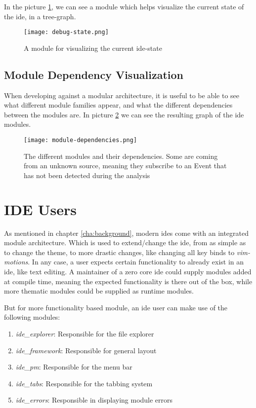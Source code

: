 In the picture \ref{pic:debugState}, we can see a module which helps visualize
the current state of the \gls*{ide}, in a tree-graph.

\begin{figure}[H]
  \centering
  \texttt{[image: debug-state.png]}
  \caption{
    A module for visualizing the current \gls*{ide}-state
  }
  \label{pic:debugState}
\end{figure}


\subsection{Module Dependency Visualization}

When developing against a modular architecture, it is useful to be able to see
what different module families appear, and what the different dependencies
between the modules are. In picture \ref{pic:modDep} we can see the resulting
graph of the \gls*{ide} modules.

\begin{figure}[H]
  \centering
  \texttt{[image: module-dependencies.png]}
  \caption{
    The different modules and their dependencies. Some are coming from an
    unknown source, meaning they subscribe to an Event that has not been
    detected during the analysis
  }
  \label{pic:modDep}
\end{figure}

\section{IDE Users}

As mentioned in chapter \ref{cha:background}, modern \gls*{ide}s come with an
integrated module architecture. Which is used to extend/change the \gls*{ide},
from as simple as to change the theme, to more drastic changes, like changing
all key binds to \textit{vim-motions}. In any case, a user expects certain
functionality to already exist in an \gls*{ide}, like text editing. A maintainer
of a zero core \gls*{ide} could supply modules added at compile time, meaning the
expected functionality is there out of the box, while more thematic modules
could be supplied as runtime modules.

But for more functionality based module, an \gls*{ide} user can make use of the
following modules:

\begin{enumerate}
  \item \textit{ide\_explorer}: Responsible for the file explorer
  \item \textit{ide\_framework}: Responsible for general layout
  \item \textit{ide\_pm}: Responsible for the menu bar
  \item \textit{ide\_tabs}: Responsible for the tabbing system
  \item \textit{ide\_errors}: Responsible in displaying module errors
\end{enumerate}

